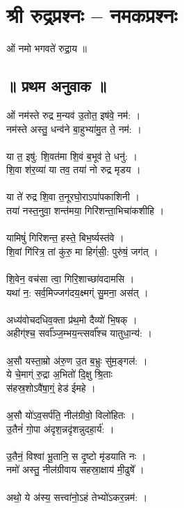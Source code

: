 
\section{श्री रुद्रप्रश्नः – नमकप्रश्नः}
ओं नमो भगवते॑ रुद्रा॒य ॥\\
\subsection{॥ प्रथम अनुवाक ॥}
ओं नम॑स्ते रुद्र म॒न्यव॑ उ॒तोत॒ इष॑वे॒ नम॑: ।\\
नम॑स्ते अस्तु॒ धन्व॑ने बा॒हुभ्या॑मु॒त ते॒ नम॑: ।\\
\\
या त॒ इषु॑: शि॒वत॑मा शि॒वं ब॒भूव॑ ते॒ धनु॑: ।\\
शि॒वा श॑र॒व्या॑ या तव॒ तया॑ नो रुद्र मृडय ।\\
\\
या ते॑ रुद्र शि॒वा त॒नूरघो॒राऽपा॑पकाशिनी ।\\
तया॑ नस्त॒नुवा॒ शन्त॑मया॒ गिरि॑शन्ता॒भिचा॑कशीहि ।\\
\\
यामिषुं॑ गिरिशन्त॒ हस्ते॒ बिभ॒र्ष्यस्त॑वे ।\\
शि॒वां गि॑रित्र॒ तां कु॑रु॒ मा हिग्ं॑सी॒: पुरु॑षं॒ जग॑त् ।\\
\\
शि॒वेन॒ वच॑सा त्वा॒ गिरि॒शाच्छा॑वदामसि ।\\
यथा॑ न॒: सर्व॒मिज्जग॑दय॒क्ष्मग्ं सु॒मना॒ अस॑त् ।\\
\\
अध्य॑वोचदधिव॒क्ता प्र॑थ॒मो दैव्यो॑ भि॒षक् ।\\
अहीग्॑श्च॒ सर्वा᳚ञ्ज॒म्भय॒न्त्सर्वा᳚श्च यातुधा॒न्य॑: ।\\
\\
अ॒सौ यस्ता॒म्रो अ॑रु॒ण उ॒त ब॒भ्रुः सु॑म॒ङ्गल॑: ।\\
ये चे॒माग्ं रु॒द्रा अ॒भितो॑ दि॒क्षु श्रि॒ताः\\
स॑हस्र॒शोऽवै॑षा॒ग्ं॒ हेड॑ ईमहे ।\\
\\
अ॒सौ यो॑ऽव॒सर्प॑ति॒ नील॑ग्रीवो॒ विलो॑हितः ।\\
उ॒तैनं॑ गो॒पा अ॑दृश॒न्नदृ॑शन्नुदहा॒र्य॑: ।\\
\\
उ॒तैनं॒ विश्वा॑ भू॒तानि॒ स दृ॒ष्टो मृ॑डयाति नः ।\\
नमो॑ अस्तु॒ नील॑ग्रीवाय सहस्रा॒क्षाय॑ मी॒ढुषे᳚ ।\\
\\
अथो॒ ये अ॑स्य॒ सत्त्वा॑नो॒ऽहं तेभ्यो॑ऽकर॒न्नम॑: ।\\
